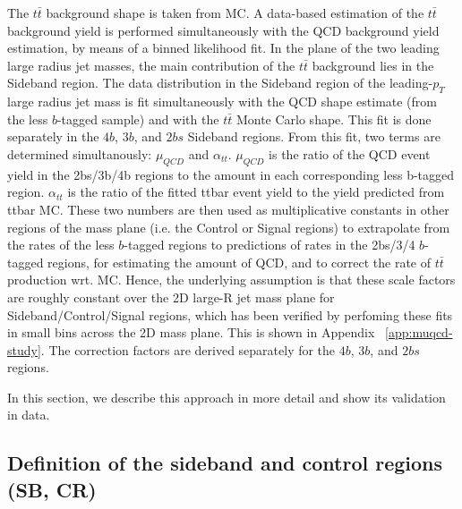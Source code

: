 The $t\bar{t}$ background shape is taken from MC. A data-based estimation of the $t\bar{t}$ background yield is performed simultaneously with the QCD background yield estimation, by means of a binned likelihood fit.
In the plane of the two leading large radius jet masses, the main contribution of the $t\bar{t}$ background lies in the Sideband region. The data distribution in the Sideband region of the leading-$p_{T}$ large radius jet mass is fit simultaneously with the QCD shape estimate (from the less $b$-tagged sample) and with the $t\bar{t}$ Monte Carlo shape. This fit is done separately in the $4b$, $3b$, and $2bs$ Sideband regions.
From this fit, two terms are determined simultanously: $\mu_{QCD}$ and $\alpha_{tt}$. $\mu_{QCD}$ is the ratio of the QCD event yield in the 2bs/3b/4b regions to the amount in each corresponding less b-tagged region. $\alpha_{tt}$ is the ratio of the fitted ttbar event yield to the yield predicted from ttbar MC.
These two numbers are then used as multiplicative constants in other regions of the mass plane (i.e. the Control or Signal regions) to extrapolate from the rates of the less $b$-tagged regions to predictions of rates in the 2bs/3/4 $b$-tagged regions, for estimating the amount of QCD, and to correct the rate of $t\bar{t}$ production wrt. MC. Hence, the underlying assumption is that these scale factors are roughly constant over the 2D large-R jet mass plane for Sideband/Control/Signal regions, which has been verified by perfoming these fits in small bins across the 2D mass plane. This is shown in Appendix ~\ref{app:muqcd-study}. The correction factors are derived separately for the $4b$, $3b$, and $2bs$ regions.

In this section, we describe this approach in more detail and show its validation in data.


\subsection{Definition of the sideband and control regions (SB, CR)}
\label{sec:boosted-SBCR}


